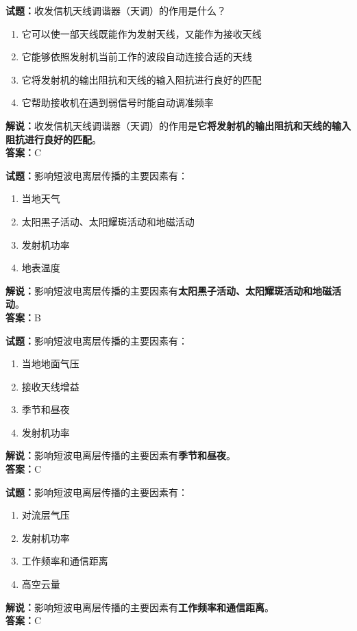 \documentclass{ctexbook}
\begin{document}
\noindent\textbf{试题：}收发信机天线调谐器（天调）的作用是什么？
\begin{enumerate}[leftmargin=3em]
\item 它可以使一部天线既能作为发射天线，又能作为接收天线
\item 它能够依照发射机当前工作的波段自动连接合适的天线
\item 它将发射机的输出阻抗和天线的输入阻抗进行良好的匹配
\item 它帮助接收机在遇到弱信号时能自动调准频率
\end{enumerate}
\noindent\textbf{解说：}收发信机天线调谐器（天调）的作用是\textbf{它将发射机的输出阻抗和天线的输入阻抗进行良好的匹配}。\\\noindent\textbf{答案：}C



\bigskip


\noindent\textbf{试题：}影响短波电离层传播的主要因素有：
\begin{enumerate}[leftmargin=3em]
\item 当地天气
\item 太阳黑子活动、太阳耀斑活动和地磁活动
\item 发射机功率
\item 地表温度
\end{enumerate}
\noindent\textbf{解说：}影响短波电离层传播的主要因素有\textbf{太阳黑子活动、太阳耀斑活动和地磁活动}。\\\noindent\textbf{答案：}B



\bigskip


\noindent\textbf{试题：}影响短波电离层传播的主要因素有：
\begin{enumerate}[leftmargin=3em]
\item 当地地面气压
\item 接收天线增益
\item 季节和昼夜
\item 发射机功率
\end{enumerate}
\noindent\textbf{解说：}影响短波电离层传播的主要因素有\textbf{季节和昼夜}。\\\noindent\textbf{答案：}C



\bigskip


\noindent\textbf{试题：}影响短波电离层传播的主要因素有：
\begin{enumerate}[leftmargin=3em]
\item 对流层气压
\item 发射机功率
\item 工作频率和通信距离
\item 高空云量
\end{enumerate}
\noindent\textbf{解说：}影响短波电离层传播的主要因素有\textbf{工作频率和通信距离}。\\\noindent\textbf{答案：}C
\end{document}
